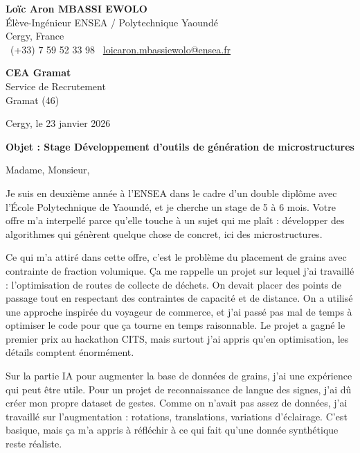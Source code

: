 \documentclass[a4paper,11pt]{article}
\begin{document}
\noindent
\textbf{Loïc Aron MBASSI EWOLO} \\
Élève-Ingénieur ENSEA / Polytechnique Yaoundé \\
Cergy, France \\
\faPhone\ (+33) 7 59 52 33 98 \quad \faEnvelope\ \href{mailto:loicaron.mbassiewolo@ensea.fr}{loicaron.mbassiewolo@ensea.fr}

\vspace{0.6cm}

\noindent
\textbf{CEA Gramat} \\
Service de Recrutement \\
Gramat (46)

\hfill Cergy, le 23 janvier 2026

\vspace{0.5cm}

\noindent\textbf{Objet : Stage Développement d'outils de génération de microstructures}

\vspace{0.4cm}

Madame, Monsieur,

\vspace{0.3cm}

Je suis en deuxième année à l'ENSEA dans le cadre d'un double diplôme avec l'École Polytechnique de Yaoundé, et je cherche un stage de 5 à 6 mois. Votre offre m'a interpellé parce qu'elle touche à un sujet qui me plaît : développer des algorithmes qui génèrent quelque chose de concret, ici des microstructures.

\vspace{0.25cm}

Ce qui m'a attiré dans cette offre, c'est le problème du placement de grains avec contrainte de fraction volumique. Ça me rappelle un projet sur lequel j'ai travaillé : l'optimisation de routes de collecte de déchets. On devait placer des points de passage tout en respectant des contraintes de capacité et de distance. On a utilisé une approche inspirée du voyageur de commerce, et j'ai passé pas mal de temps à optimiser le code pour que ça tourne en temps raisonnable. Le projet a gagné le premier prix au hackathon CITS, mais surtout j'ai appris qu'en optimisation, les détails comptent énormément.

\vspace{0.25cm}

Sur la partie IA pour augmenter la base de données de grains, j'ai une expérience qui peut être utile. Pour un projet de reconnaissance de langue des signes, j'ai dû créer mon propre dataset de gestes. Comme on n'avait pas assez de données, j'ai travaillé sur l'augmentation : rotations, translations, variations d'éclairage. C'est basique, mais ça m'a appris à réfléchir à ce qui fait qu'une donnée synthétique reste réaliste.
\end{document}
